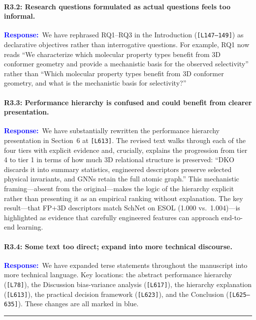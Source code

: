 \documentclass[11pt]{article}
\newcommand{\point}[1]{\paragraph{#1}}
\newcommand{\response}{\textcolor{blue}{\textbf{Response:}}~}
\newcommand{\lines}[1]{\texttt{[L#1]}}
\begin{document}
\point{R3.2: Research questions formulated as actual questions feels too informal.}

\response We have rephrased RQ1--RQ3 in the Introduction (\lines{147--149}) as declarative objectives rather than interrogative questions. For example, RQ1 now reads ``We characterize which molecular property types benefit from 3D conformer geometry and provide a mechanistic basis for the observed selectivity'' rather than ``Which molecular property types benefit from 3D conformer geometry, and what is the mechanistic basis for selectivity?''

\point{R3.3: Performance hierarchy is confused and could benefit from clearer presentation.}

\response We have substantially rewritten the performance hierarchy presentation in Section~6 at \lines{613}. The revised text walks through each of the four tiers with explicit evidence and, crucially, explains the progression from tier 4 to tier 1 in terms of how much 3D relational structure is preserved: ``DKO discards it into summary statistics, engineered descriptors preserve selected physical invariants, and GNNs retain the full atomic graph.'' This mechanistic framing---absent from the original---makes the logic of the hierarchy explicit rather than presenting it as an empirical ranking without explanation. The key result---that FP+3D descriptors match SchNet on ESOL (1.000 vs.\ 1.004)---is highlighted as evidence that carefully engineered features can approach end-to-end learning.

\point{R3.4: Some text too direct; expand into more technical discourse.}

\response We have expanded terse statements throughout the manuscript into more technical language. Key locations: the abstract performance hierarchy (\lines{78}), the Discussion bias-variance analysis (\lines{617}), the hierarchy explanation (\lines{613}), the practical decision framework (\lines{623}), and the Conclusion (\lines{625--635}). These changes are all marked in blue.

\vspace{1em}
\noindent\rule{\textwidth}{0.4pt}
\vspace{0.5em}
\end{document}
